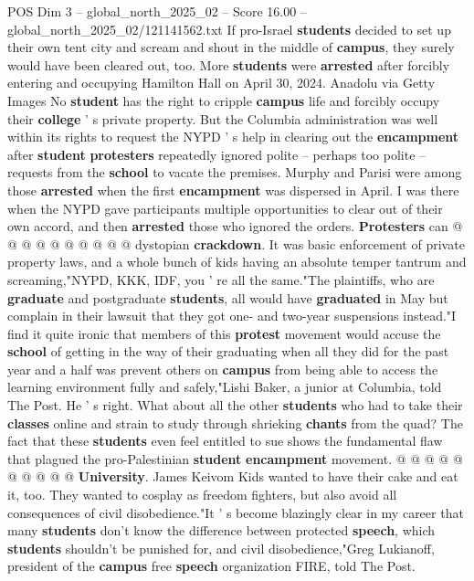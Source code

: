 \begin{textsample}{POS Dim 3 – global\_north\_2025\_02 – Score 16.00 – global\_north\_2025\_02/121141562.txt}
If pro-Israel \textbf{students} decided to set up their own tent city and scream and shout in the middle of \textbf{campus}, they surely would have been cleared out, too.
More \textbf{students} were \textbf{arrested} after forcibly entering and occupying Hamilton Hall on April 30, 2024.
Anadolu via Getty Images No \textbf{student} has the right to cripple \textbf{campus} life and forcibly occupy their \textbf{college} ' s private property.
But the Columbia administration was well within its rights to request the NYPD ' s help in clearing out the \textbf{encampment} after \textbf{student} \textbf{protesters} repeatedly ignored polite -- perhaps too polite -- requests from the \textbf{school} to vacate the premises.
Murphy and Parisi were among those \textbf{arrested} when the first \textbf{encampment} was dispersed in April.
I was there when the NYPD gave participants multiple opportunities to clear out of their own accord, and then \textbf{arrested} those who ignored the orders. \textbf{Protesters} can @ @ @ @ @ @ @ @ @ @ dystopian \textbf{crackdown}.
It was basic enforcement of private property laws, and a whole bunch of kids having an absolute temper tantrum and screaming,"NYPD, KKK, IDF, you ' re all the same."The plaintiffs, who are \textbf{graduate} and postgraduate \textbf{students}, all would have \textbf{graduated} in May but complain in their lawsuit that they got one- and two-year suspensions instead."I find it quite ironic that members of this \textbf{protest} movement would accuse the \textbf{school} of getting in the way of their graduating when all they did for the past year and a half was prevent others on \textbf{campus} from being able to access the learning environment fully and safely,"Lishi Baker, a junior at Columbia, told The Post.
He ' s right.
What about all the other \textbf{students} who had to take their \textbf{classes} online and strain to study through shrieking \textbf{chants} from the quad?
The fact that these \textbf{students} even feel entitled to sue shows the fundamental flaw that plagued the pro-Palestinian \textbf{student} \textbf{encampment} movement. @ @ @ @ @ @ @ @ @ @ \textbf{University}.
James Keivom Kids wanted to have their cake and eat it, too.
They wanted to cosplay as freedom fighters, but also avoid all consequences of civil disobedience."It ' s become blazingly clear in my career that many \textbf{students} don't know the difference between protected \textbf{speech}, which \textbf{students} shouldn't be punished for, and civil disobedience,"Greg Lukianoff, president of the \textbf{campus} free \textbf{speech} organization FIRE, told The Post.

\end{textsample}
